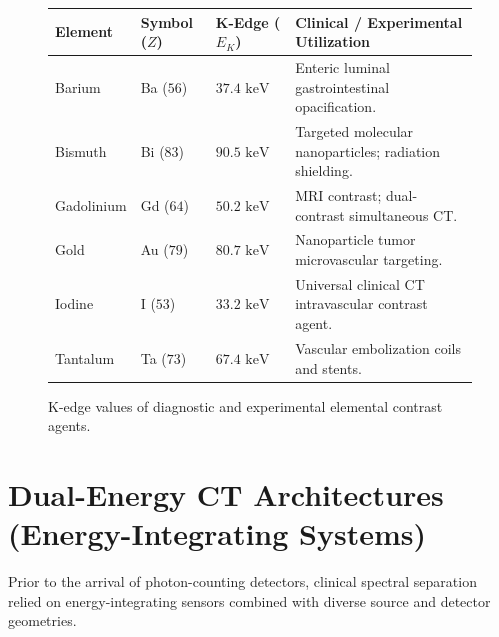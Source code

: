 \documentclass[11pt,a4paper]{article}
\begin{document}
\begin{figure}[htbp]
\centering
\begin{tcolorbox}[colback=blue!5!white,colframe=blue!60!black,title=\textbf{Quantum K-Shell Energy Levels of Contrast Elements},width=\linewidth]
\small
\setlength{\tabcolsep}{2pt}
\begin{tabular}{p{2.6cm} p{2.0cm} p{2.4cm} p{5.5cm}}
\toprule
\textbf{Element} & \textbf{Symbol ($Z$)} & \textbf{K-Edge ($E_K$)} & \textbf{Clinical / Experimental Utilization} \\
\midrule
Barium & Ba ($56$) & $37.4\text{ keV}$ & Enteric luminal gastrointestinal opacification. \\
\addlinespace
Bismuth & Bi ($83$) & $90.5\text{ keV}$ & Targeted molecular nanoparticles; radiation shielding. \\
\addlinespace
Gadolinium & Gd ($64$) & $50.2\text{ keV}$ & MRI contrast; dual-contrast simultaneous CT. \\
\addlinespace
Gold & Au ($79$) & $80.7\text{ keV}$ & Nanoparticle tumor microvascular targeting. \\
\addlinespace
Iodine & I ($53$) & $33.2\text{ keV}$ & Universal clinical CT intravascular contrast agent. \\
\addlinespace
Tantalum & Ta ($73$) & $67.4\text{ keV}$ & Vascular embolization coils and stents. \\
\bottomrule
\end{tabular}
\end{tcolorbox}
\caption{K-edge values of diagnostic and experimental elemental contrast agents.}
\label{fig:k_edges}
\end{figure}

\section{Dual-Energy CT Architectures (Energy-Integrating Systems)}

Prior to the arrival of photon-counting detectors, clinical spectral separation relied on energy-integrating sensors combined with diverse source and detector geometries.
\end{document}
